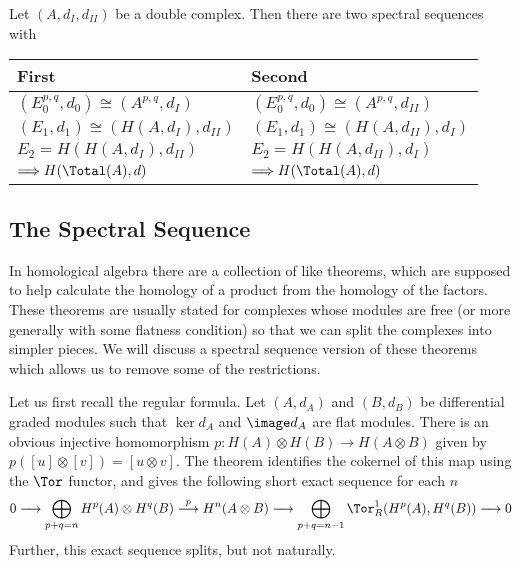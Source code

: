 \begin{thm}
Let $(A,d_I,d_{II})$ be a double complex. Then there are two spectral sequences with
\begin{table}[h]
\centering
\begin{tabular}{|l|l|}
	\hline
	First & Second \\
	\hline \hline
	$(E_0^{p,q},d_0) \cong (A^{p,q},d_I)$ &		$(E_0^{p,q},d_0) \cong (A^{p,q},d_{II})$ \\
	\hline
	$(E_1,d_1) \cong (H(A,d_I),d_{II})$ & 		$(E_1,d_1) \cong (H(A,d_{II}),d_I)$ \\
	\hline
	$E_2 = H(H(A,d_I),d_{II})$ & 				$E_2 = H(H(A,d_{II}),d_I)$ \\
	\hline
	$\Longrightarrow H(\Total(A),d)$ & 		$\Longrightarrow H(\Total(A),d)$ \\	\hline
\end{tabular}
\end{table}
\end{thm}



\subsection{The \Kunneth Spectral Sequence}

In homological algebra there are a collection of \Kunneth like theorems, which are supposed to help calculate the homology of a product from the homology of the factors. These theorems are usually stated for complexes whose modules are free (or more generally with some flatness condition) so that we can split the complexes into simpler pieces. We will discuss a spectral sequence version of these theorems which allows us to remove some of the restrictions.

Let us first recall the regular \Kunneth formula. Let $(A,d_A)$ and $(B,d_B)$ be differential graded modules such that $\ker d_A$ and $\image d_A$ are flat modules. There is an obvious injective homomorphism $p : H(A) \otimes H(B) \rightarrow H(A \otimes B)$ given by $p([u] \otimes [v]) = [u \otimes v]$. The \Kunneth theorem identifies the cokernel of this map using the $\Tor$ functor, and gives the following short exact sequence for each $n$
\[ 0 \longrightarrow \bigoplus_{p+q=n} H^p(A) \otimes H^q(B) \stackrel{p}{\longrightarrow} H^n(A \otimes B) \longrightarrow \bigoplus_{p+q=n-1} \Tor_R^1 (H^p(A),H^q(B)) \longrightarrow 0 \]
Further, this exact sequence splits, but not naturally. 

